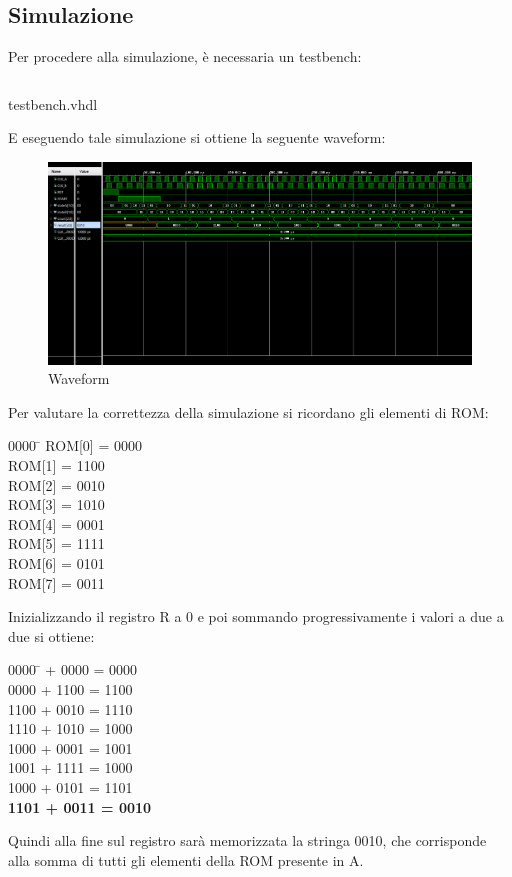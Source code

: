 \subsection{Simulazione}
Per procedere alla simulazione, è necessaria un testbench:
\begin{code}
    \inputminted[frame=lines, framesep=2mm, baselinestretch=1.2, bgcolor=LightGray, fontsize=\footnotesize, linenos]{vhdl}{vhdl_files/preappDicembre/testbench.vhd}
    \caption{testbench.vhdl}
    \label{lst:mux_2_1}
\end{code}
E eseguendo tale simulazione si ottiene la seguente waveform:
\begin{figure}[H]
	\centering
	\includegraphics[width=1\textwidth]{img/preappDicembre/waveformPreappDic}
	\caption{Waveform}
	\label{wf_preapp} 
\end{figure}
Per valutare la correttezza della simulazione si ricordano gli elementi di ROM:
\begin{center}
\begin{tabbing}
0000 \=  \kill %
ROM[0] = 0000 \\
ROM[1] = 1100 \\
ROM[2] = 0010 \\
ROM[3] = 1010 \\
ROM[4] = 0001 \\
ROM[5] = 1111 \\
ROM[6] = 0101 \\
ROM[7] = 0011 \\
\end{tabbing}
\end{center}
Inizializzando il registro R a 0 e poi sommando progressivamente i valori a due a due si ottiene:
\begin{tabbing}
0000 \=   + 0000 = 0000\\
0000 + 1100 = 1100\\
1100 + 0010 = 1110\\
1110 + 1010 = 1000 \\
1000 + 0001 = 1001\\
1001 + 1111 = 1000 \\
1000 + 0101 = 1101 \\
\textbf{1101 + 0011 = 0010} \\
\end{tabbing}
Quindi alla fine sul registro sarà memorizzata la stringa 0010, che corrisponde alla somma di tutti gli elementi della ROM presente in A.
